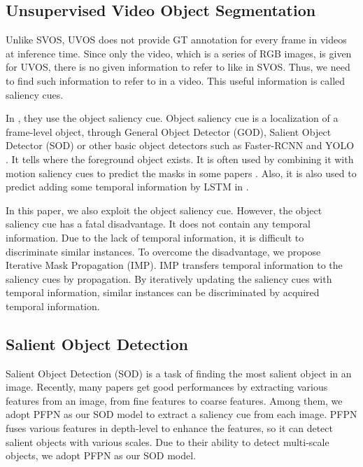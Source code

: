 \documentclass[letterpaper]{article} \usepackage{aaai22}  \usepackage{times}  \usepackage{helvet}  \usepackage{courier}  \usepackage[hyphens]{url}  \usepackage{graphicx} \urlstyle{rm} \def\UrlFont{\rm}  \usepackage{natbib}  \usepackage{caption} \DeclareCaptionStyle{ruled}{labelfont=normalfont,labelsep=colon,strut=off} \frenchspacing  \setlength{\pdfpagewidth}{8.5in}  \setlength{\pdfpageheight}{11in}  \usepackage{algorithm}
\begin{document}
\subsection{Unsupervised Video Object Segmentation}

Unlike SVOS, UVOS does not provide GT annotation for every frame in videos at inference time. 
Since only the video, which is a series of RGB images, is given for UVOS, there is no given information to refer to like in SVOS. Thus, we need to find such information to refer to in a video. This useful information is called saliency cues. 

In \citet{jain2017fusionseg,wang2019learning,faisal2019exploiting,tokmakov2019learning,zhuo2019unsupervised}, they use the object saliency cue. Object saliency cue is a  localization of a frame-level object, through General Object Detector (GOD), Salient Object Detector (SOD) or other basic object detectors such as Faster-RCNN \citep{ren2016faster} and YOLO \citep{redmon2016you}. It tells where the foreground object exists. It is often used by combining it with motion saliency cues to predict the masks in some papers \citep{jain2017fusionseg,faisal2019exploiting,tokmakov2019learning,zhuo2019unsupervised}. Also, it is also used to predict adding some temporal information by LSTM in \citet{wang2019learning}.

In this paper, we also exploit the object saliency cue. However, the object saliency cue has a fatal disadvantage. It does not contain any temporal information. Due to the lack of temporal information, it is difficult to discriminate similar instances. To overcome the disadvantage, we propose Iterative Mask Propagation (IMP). IMP transfers temporal information to the saliency cues by propagation. By iteratively updating the saliency cues with temporal information, similar instances can be discriminated by acquired temporal information. 

\subsection{Salient Object Detection}

Salient Object Detection (SOD) is a task of finding the most salient object in an image. Recently, many papers \citep{wu2019stacked,liu2018picanet,huang201950,wu2019mutual,wang2020progressive} get good performances by extracting various features from an image, from fine features to coarse features. 
Among them, we adopt PFPN \citep{wang2020progressive} as our SOD model to extract a saliency cue from each image. PFPN \citep{wang2020progressive} fuses various features in depth-level to enhance the features, so it can detect salient objects with various scales. Due to their ability to detect multi-scale objects, we adopt PFPN \citep{wang2020progressive} as our SOD model.
\end{document}
